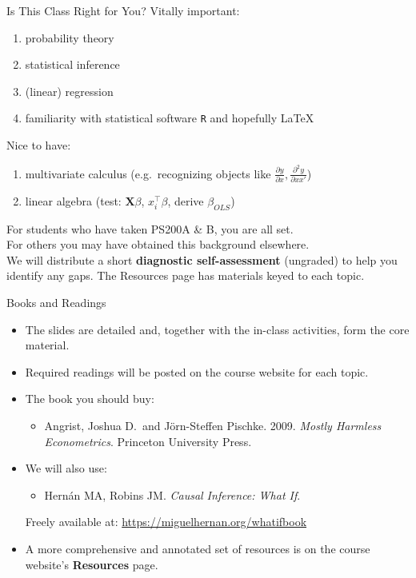 \documentclass[xcolor=dvipsnames]{beamer}
\newcommand\makebiggaps{\addtolength{\itemsep}{.5\baselineskip}}
\newcommand\X{{\bm X}}
\begin{document}
\begin{frame}{Is This Class Right for You?}
\small
{} Vitally important: \\
\begin{enumerate}
   \item<2-> probability theory
   \item<3-> statistical inference
   \item<4-> (linear) regression
   \item<5-> familiarity with statistical software \texttt{R} and hopefully \LaTeX
\end{enumerate}
 Nice to have:
\begin{enumerate}
   \item<7-> multivariate calculus (e.g.\ recognizing objects like $\frac{\partial y}{\partial x}, \frac{\partial^2 y}{\partial xx'}$)\small
   \item<8-> linear algebra \scriptsize (test: $\X\beta$, $x_i^{\top}\beta$, derive $\beta_{OLS}$)\small
\end{enumerate}
\smallskip
{} For students who have taken PS200A \& B, you are all set.  \\
\smallskip
{} For others you may have obtained this background elsewhere. \\
\smallskip
{} We will distribute a short \textbf{diagnostic self-assessment} (ungraded) to help you identify any gaps. The Resources page has materials keyed to each topic.\\
\smallskip
\end{frame}


\begin{frame}{Books and Readings}
\begin{itemize}
\makebiggaps
\small
\item<1-> The slides are detailed and, together with the in-class activities, form the core material.
\item<2-> Required readings will be posted on the course website for each topic.
\item<3-> The book you should buy:
  \begin{itemize}
  \item Angrist, Joshua D.\ and J\"orn-Steffen Pischke. 2009. \textit{Mostly Harmless Econometrics}. Princeton University Press.
  \end{itemize}
\item<4-> We will also use:
  \begin{itemize}
  \item Hern\'an MA, Robins JM. \textit{Causal Inference: What If}.
  \end{itemize}
  Freely available at: \scriptsize \url{https://miguelhernan.org/whatifbook}
\normalsize
\item<5-> A more comprehensive and annotated set of resources is on the course website's \textbf{Resources} page.
\end{itemize}
\end{frame}
\end{document}
